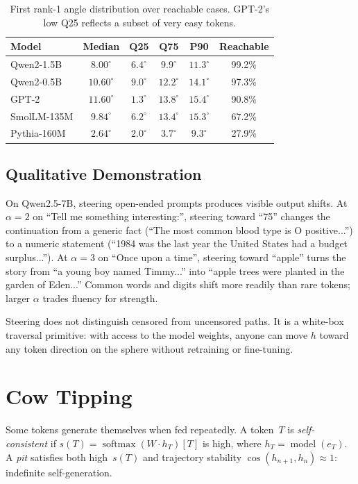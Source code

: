 \documentclass{article}
\begin{document}
\begin{table}[h]
\centering
\begin{tabular}{lccccc}
\toprule
Model & Median & Q25 & Q75 & P90 & Reachable \\
\midrule
Qwen2-1.5B & $8.00^\circ$ & $6.4^\circ$ & $9.9^\circ$ & $11.3^\circ$ & 99.2\% \\
Qwen2-0.5B & $10.60^\circ$ & $9.0^\circ$ & $12.2^\circ$ & $14.1^\circ$ & 97.3\% \\
GPT-2 & $11.60^\circ$ & $1.3^\circ$ & $13.8^\circ$ & $15.4^\circ$ & 90.8\% \\
SmolLM-135M & $9.84^\circ$ & $6.2^\circ$ & $13.4^\circ$ & $15.3^\circ$ & 67.2\% \\
Pythia-160M & $2.64^\circ$ & $2.0^\circ$ & $3.7^\circ$ & $9.3^\circ$ & 27.9\% \\
\bottomrule
\end{tabular}
\caption{First rank-1 angle distribution over reachable cases. GPT-2's low Q25
reflects a subset of very easy tokens.}
\label{tab:angles}
\end{table}

\subsection{Qualitative Demonstration}

On Qwen2.5-7B, steering open-ended prompts produces visible output shifts. At
$\alpha=2$ on ``Tell me something interesting:'', steering toward ``75'' changes
the continuation from a generic fact (``The most common blood type is O
positive...'') to a numeric statement (``1984 was the last year the United
States had a budget surplus...''). At $\alpha=3$ on ``Once upon a time'',
steering toward ``apple'' turns the story from ``a young boy named Timmy...''
into ``apple trees were planted in the garden of Eden...'' Common words and
digits shift more readily than rare tokens; larger $\alpha$ trades fluency for
strength.

Steering does not distinguish censored from uncensored paths. It is a
white-box traversal primitive: with access to the model weights, anyone can move
$h$ toward any token direction on the sphere without retraining or fine-tuning.

\section{Cow Tipping}

Some tokens generate themselves when fed repeatedly. A token~$T$ is
\emph{self-consistent} if $s(T) = \operatorname{softmax}(W \cdot h_T)[T]$ is
high, where $h_T = \operatorname{model}(e_T)$. A \emph{pit} satisfies both
high~$s(T)$ and trajectory stability $\cos(h_{n+1}, h_n) \approx 1$:
indefinite self-generation.
\end{document}
